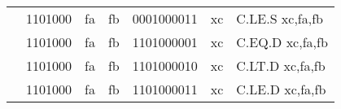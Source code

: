 \begin{table}[p]
\begin{small}
\begin{center}
\begin{tabular}{rcccccccccl}
&
\multicolumn{2}{|c|}{1101000} &
\multicolumn{1}{c|}{fa} &
\multicolumn{1}{c|}{fb} &
\multicolumn{4}{c|}{0001000011} &
\multicolumn{1}{c|}{xc} & C.LE.S xc,fa,fb \\
\cline{2-10}
  

&
\multicolumn{2}{|c|}{1101000} &
\multicolumn{1}{c|}{fa} &
\multicolumn{1}{c|}{fb} &
\multicolumn{4}{c|}{1101000001} &
\multicolumn{1}{c|}{xc} & C.EQ.D xc,fa,fb \\
\cline{2-10}
  

&
\multicolumn{2}{|c|}{1101000} &
\multicolumn{1}{c|}{fa} &
\multicolumn{1}{c|}{fb} &
\multicolumn{4}{c|}{1101000010} &
\multicolumn{1}{c|}{xc} & C.LT.D xc,fa,fb \\
\cline{2-10}
  

&
\multicolumn{2}{|c|}{1101000} &
\multicolumn{1}{c|}{fa} &
\multicolumn{1}{c|}{fb} &
\multicolumn{4}{c|}{1101000011} &
\multicolumn{1}{c|}{xc} & C.LE.D xc,fa,fb \\
\cline{2-10}
  

\end{tabular}
\end{center}
\end{small}

\label{instr-table}
\end{table}
  

\newpage

